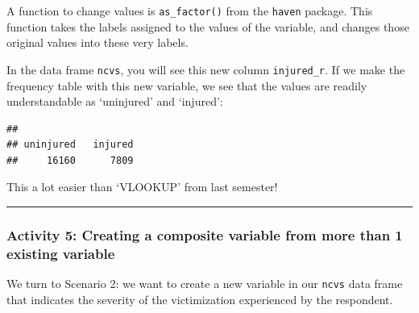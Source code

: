 \documentclass[
]{book}
\newenvironment{Shaded}{\begin{snugshade}}{\end{snugshade}}
\newcommand{\CommentTok}[1]{\textcolor[rgb]{0.56,0.35,0.01}{\textit{#1}}}
\newcommand{\FunctionTok}[1]{\textcolor[rgb]{0.00,0.00,0.00}{#1}}
\newcommand{\NormalTok}[1]{#1}
\newcommand{\OtherTok}[1]{\textcolor[rgb]{0.56,0.35,0.01}{#1}}
\newcommand{\SpecialCharTok}[1]{\textcolor[rgb]{0.00,0.00,0.00}{#1}}
\begin{document}
A function to change values is \texttt{as\_factor()} from the \texttt{haven} package. This function takes the labels assigned to the values of the variable, and changes those original values into these very labels.

\begin{Shaded}
\end{Shaded}

In the data frame \texttt{ncvs}, you will see this new column \texttt{injured\_r}. If we make the frequency table with this new variable, we see that the values are readily understandable as `uninjured' and `injured':

\begin{Shaded}
\end{Shaded}

\begin{verbatim}
## 
## uninjured   injured 
##     16160      7809
\end{verbatim}

This a lot easier than `VLOOKUP' from last semester!

\begin{center}\rule{0.5\linewidth}{0.5pt}\end{center}

\hypertarget{activity-5-creating-a-composite-variable-from-more-than-1-existing-variable}{%
\subsubsection{Activity 5: Creating a composite variable from more than 1 existing variable}\label{activity-5-creating-a-composite-variable-from-more-than-1-existing-variable}}

We turn to Scenario 2: we want to create a new variable in our \texttt{ncvs} data frame that indicates the severity of the victimization experienced by the respondent.
\end{document}
